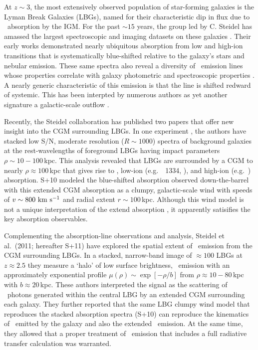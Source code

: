 \documentclass[12pt,preprint]{aastex}
\begin{document}
At $z\sim 3$, the most extensively observed population of star-forming
galaxies is the Lyman Break Galaxies (LBGs), named for their
characteristic dip in flux due to \lya\ absorption by the IGM.
For the past $\sim 15$ years, the group led by C. Steidel has
amassed the largest spectroscopic and imaging datasets on these
galaxies \citep{steidel96,shapley03,reddyXX}.  Their early works
demonstrated nearly ubiquitous absorption from low and high-ion
transitions that is systematically blue-shifted relative to the
galaxy's stars and nebular emission.  These same spectra also reveal
a diversity of \lya\ emission lines whose properties correlate with galaxy photometric
and spectroscopic properties \citep{shapley08,cooke08}.  
A nearly generic characteristic of this emission is that
the line is 
shifted redward of systemic.  This has been interpted by numerous
authors as yet another signature a galactic-scale outflow
\citep[e.g.][]{pettini,verhamme}. 

Recently, the Steidel
collaboration has published two papers that offer new insight into the
CGM surrounding LBGs.   In one experiment \citep[][hereafter
S+10]{steidel+10}, the authors have stacked low S/N, moderate
resolution ($R \sim 1000$) spectra of background galaxies at the
rest-wavelengths of foreground LBGs having impact parameters $\rho \sim
10-100$\,kpc.  This analysis revealed that LBGs are surrounded by a
CGM to nearly $\rho \approx 100$\,kpc 
that gives rise to , low-ion (e.g.\ ~1334,
), and high-ion (e.g.\ ) absorption. 
S+10 modeled the blue-shifted absorption
observed down-the-barrel with this extended CGM absorption 
as a clumpy, galactic-scale wind with speeds of
$v \sim 800 \, \, {\rm km~s^{-1}}$ and radial extent $r \sim 100$\,kpc.  Although
this wind model is not a unique interpretation of the extend
 absorption \citep{fpk+11}, it apparently satisifies the key
absorption observables.

Complementing the absorption-line observations and analysis,
Steidel et al.\ (2011; hereafter S+11) have explored the spatial
extent of \lya\ emission from the CGM surrounding LBGs.  In a stacked,
narrow-band image of $\approx 100$ LBGs at $z \approx 2.5$ they
measure a `halo' of low surface brightness, \lya\ emission with an
approximately exponential profile $\mu(\rho) \sim \exp[-\rho/b]$ from
$\rho \approx 10-80$\,kpc with $b \approx 20$\,kpc.  These authors
interpreted the signal as the scattering of \lya\ photons generated
within the central LBG by an extended CGM surrounding each galaxy.
They further reported that the same LBG clumpy wind model that
reproduces the stacked absorption spectra (S+10) can reproduce the
kinematics of \lya\ emitted by the galaxy and also the extended \lya\
emission.  At the same time, they allowed that a proper treatment
of \lya\ emission that includes a full radiative transfer calculation was warranted.  
\end{document}
